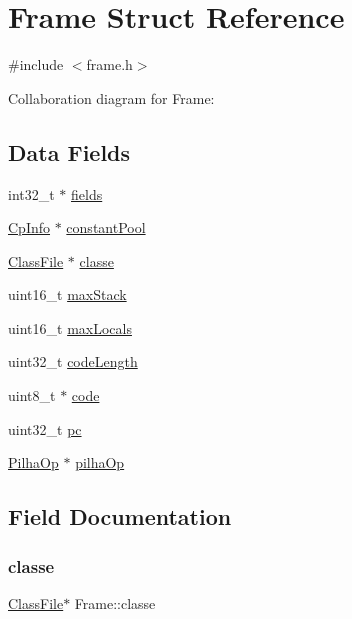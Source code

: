 \hypertarget{structFrame}{}\section{Frame Struct Reference}
\label{structFrame}


{\ttfamily \#include $<$frame.\+h$>$}



Collaboration diagram for Frame\+:
\subsection*{Data Fields}
\begin{DoxyCompactItemize}
\item 
int32\+\_\+t $\ast$ \hyperlink{structFrame_a0fb4b4dcac7ecbbecc2f62939c517aea}{fields}
\item 
\hyperlink{structCpInfo}{Cp\+Info} $\ast$ \hyperlink{structFrame_a8067fdcfa9b9b35c39434ed4689b3aea}{constant\+Pool}
\item 
\hyperlink{structClassFile}{Class\+File} $\ast$ \hyperlink{structFrame_a3ce27d5278d61a0abaeca31956febc1f}{classe}
\item 
uint16\+\_\+t \hyperlink{structFrame_a378c00e14ef1f63cbbfa4e984502b652}{max\+Stack}
\item 
uint16\+\_\+t \hyperlink{structFrame_a5d933cb41bf8f544aecba4ef1723ab1a}{max\+Locals}
\item 
uint32\+\_\+t \hyperlink{structFrame_a1ed982d1a0902c22374fcde6a8938b69}{code\+Length}
\item 
uint8\+\_\+t $\ast$ \hyperlink{structFrame_a9de8be272246d00c7a0c2ddc899fe8f2}{code}
\item 
uint32\+\_\+t \hyperlink{structFrame_a91e50d2091184efb52b6d7c0c21fd4b2}{pc}
\item 
\hyperlink{structPilhaOp}{Pilha\+Op} $\ast$ \hyperlink{structFrame_addbe682d4328100186a4c03da7c2b9a2}{pilha\+Op}
\end{DoxyCompactItemize}


\subsection{Field Documentation}
\mbox{\label{structFrame_a3ce27d5278d61a0abaeca31956febc1f}} 
\subsubsection{\texorpdfstring{classe}{classe}}
{\footnotesize\ttfamily \hyperlink{structClassFile}{Class\+File}$\ast$ Frame\+::classe}

